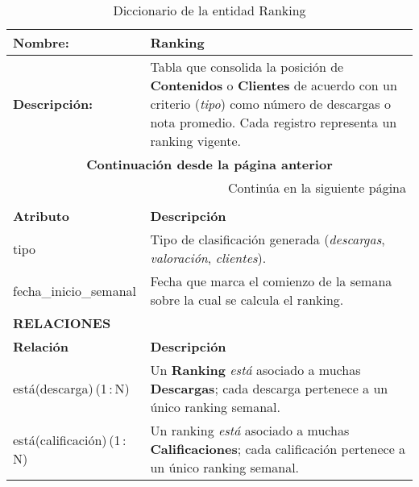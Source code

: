 \renewcommand{\arraystretch}{1.3}
\begin{longtable}{|p{3.5cm}|p{10cm}|}
\caption{Diccionario de la entidad Ranking}
\label{tab:diccionarioRanking} \\ 
\hline
\textbf{Nombre:} & Ranking \\
\hline
\textbf{Descripción:} & 
Tabla que consolida la posición de \textbf{Contenidos} o
\textbf{Clientes} de acuerdo con un criterio (\textit{tipo}) como número
de descargas o nota promedio.  Cada registro representa un ranking
vigente. \\ \hline
\endfirsthead

\multicolumn{2}{c}{\textbf{Continuación desde la página anterior}} \\ 
\endhead

\hline \multicolumn{2}{r}{{Continúa en la siguiente página}} \\ 
\endfoot

\hline
\endlastfoot

\multicolumn{2}{|p{13.5cm}|}{\textbf{ATRIBUTOS}} \\ \hline
\textbf{Atributo} & \textbf{Descripción} \\ \hline
tipo                   & Tipo de clasificación generada  
(\emph{descargas}, \emph{valoración}, \emph{clientes}). \\ \hline
fecha\_inicio\_semanal & Fecha que marca el comienzo de la semana sobre la cual se calcula el ranking. \\ \hline

\multicolumn{2}{|p{13.5cm}|}{\textbf{RELACIONES}} \\ \hline
\textbf{Relación} & \textbf{Descripción} \\ \hline
está(descarga)\,(1\,:\,N) & Un \textbf{Ranking} \textit{está} asociado a muchas \textbf{Descargas};
cada descarga pertenece a un único ranking semanal. \\ \hline
está(calificación)\,(1\,:\,N) & Un ranking \textit{está} asociado a muchas \textbf{Calificaciones};
cada calificación pertenece a un único ranking semanal. \\ \hline
\end{longtable}